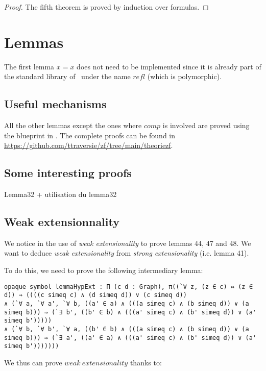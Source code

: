 \documentclass[a4paper]{article}
\begin{document}
\begin{proof}
The fifth theorem is proved by induction over formulas.
\end{proof}

\section{Lemmas}

The first lemma $x=x$ does not need to be implemented since it is already part of the standard library of \dedukti \ under the name $refl$ (which is polymorphic).


\subsection{Useful mechanisms}

All the other lemmas except the ones where $comp$ is involved are proved using the blueprint in \cite{zermodulo53}. The complete proofs can be found in \url{https://github.com/ttraversie/zf/tree/main/theoriezf}.

\subsection{Some interesting proofs}

Lemma32 + utilisation du lemma32

\subsection{Weak extensionnality}

We notice in \cite{zermodulo53} the use of \textit{weak extensionality} to prove lemmas 44, 47 and 48. We want to deduce \textit{weak extensionality} from \textit{strong extensionality} (i.e. lemma 41).

To do this, we need to prove the following intermediary lemma:

\begin{lstlisting}
opaque symbol lemmaHypExt : Π (c d : Graph), π((`∀ z, (z ∈ c) ⇔ (z ∈ d)) ⇒ ((((c simeq c) ∧ (d simeq d)) ∨ (c simeq d))
∧ (`∀ a, `∀ a', `∀ b, ((a' ∈ a) ∧ (((a simeq c) ∧ (b simeq d)) ∨ (a simeq b))) ⇒ (`∃ b', ((b' ∈ b) ∧ (((a' simeq c) ∧ (b' simeq d)) ∨ (a' simeq b')))))
∧ (`∀ b, `∀ b', `∀ a, ((b' ∈ b) ∧ (((a simeq c) ∧ (b simeq d)) ∨ (a simeq b))) ⇒ (`∃ a', ((a' ∈ a) ∧ (((a' simeq c) ∧ (b' simeq d)) ∨ (a' simeq b')))))))
\end{lstlisting}

We thus can prove $weak \ extensionality$ thanks to:
\end{document}
